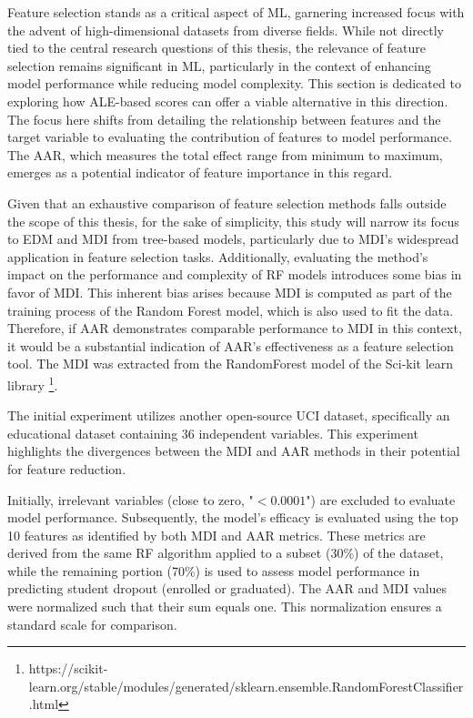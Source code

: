 Feature selection stands as a critical aspect of \gls{ML}, garnering increased focus with the advent of high-dimensional datasets from diverse fields. While not directly tied to the central research questions of this thesis, the relevance of feature selection remains significant in \gls{ML}, particularly in the context of enhancing model performance while reducing model complexity. This section is dedicated to exploring how \gls{ALE}-based scores can offer a viable alternative in this direction. The focus here shifts from detailing the relationship between features and the target variable to evaluating the contribution of features to model performance. The \gls{AAR}, which measures the total effect range from minimum to maximum, emerges as a potential indicator of feature importance in this regard.

Given that an exhaustive comparison of feature selection methods falls outside the scope of this thesis, for the sake of simplicity, this study will narrow its focus to \gls{EDM} and \gls{MDI} from tree-based models, particularly due to \gls{MDI}'s widespread application in feature selection tasks. Additionally, evaluating the method's impact on the performance and complexity of RF models introduces some bias in favor of \gls{MDI}. This inherent bias arises because \gls{MDI} is computed as part of the training process of the Random Forest model, which is also used to fit the data. Therefore, if \gls{AAR} demonstrates comparable performance to \gls{MDI} in this context, it would be a substantial indication of \gls{AAR}'s effectiveness as a feature selection tool. The \gls{MDI} was extracted from the RandomForest model of the Sci-kit learn library \footnote{https://scikit-learn.org/stable/modules/generated/sklearn.ensemble.RandomForestClassifier.html}. 

The initial experiment utilizes another open-source UCI dataset, specifically an educational dataset \cite{Realinho2022PredictingSuccess} containing 36 independent variables. This experiment highlights the divergences between the \gls{MDI} and \gls{AAR} methods in their potential for feature reduction. 

Initially, irrelevant variables (close to zero, "\(< 0.0001\)") are excluded to evaluate model performance. Subsequently, the model's efficacy is evaluated using the top 10 features as identified by both \gls{MDI} and \gls{AAR} metrics. These metrics are derived from the same RF algorithm applied to a subset (30\%) of the dataset, while the remaining portion (70\%) is used to assess model performance in predicting student dropout (enrolled or graduated). The \gls{AAR} and \gls{MDI} values were normalized such that their sum equals one. This normalization ensures a standard scale for comparison. 

